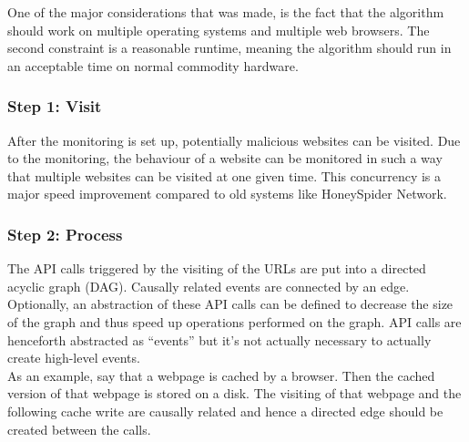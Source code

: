 One of the major considerations that was made, is the fact that the algorithm should work on multiple operating systems and multiple web browsers. The second constraint is a reasonable runtime, meaning the algorithm should run in an acceptable time on normal commodity hardware.

\subsubsection{Step 1: Visit}

After the monitoring is set up, potentially malicious websites can be visited. Due to the monitoring, the behaviour of a website can be monitored in such a way that multiple websites can be visited at one given time. This concurrency is a major speed improvement compared to old systems like HoneySpider Network.


\subsubsection{Step 2: Process}

%

The API calls triggered by the visiting of the URLs are put into a directed acyclic graph (DAG). Causally related events are connected by an edge. Optionally, an abstraction of these API calls can be defined to decrease the size of the graph and thus speed up operations performed on the graph. API calls are henceforth abstracted as ``events'' but it's not actually necessary to actually create high-level events.\\


As an example, say that a webpage is cached by a browser. Then the cached version of that webpage is stored on a disk. The visiting of that webpage and the following cache write are causally related and hence a directed edge should be created between the calls.\\

